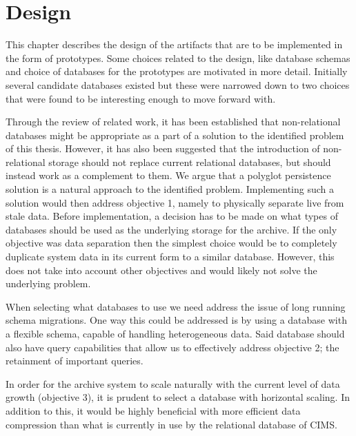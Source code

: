 \chapter{Design}
\label{chap:design}


This chapter describes the design of the artifacts that are to be implemented in the form of prototypes. Some choices related to the design, like database schemas and choice of databases for the prototypes are motivated in more detail. Initially several candidate databases existed but these were narrowed down to two choices that were found to be interesting enough to move forward with. 

Through the review of related work, it has been established that non-relational databases might be appropriate as a part of a solution to the identified problem of this thesis. However, it has also been suggested \cite{NoSQLSurvey} that the introduction of non-relational storage should not replace current relational databases, but should instead work as a complement to them. We argue that a polyglot persistence solution is a natural approach to the identified problem. Implementing such a solution would then address objective 1, namely to physically separate live from stale data. Before implementation, a decision has to be made on what types of databases should be used as the underlying storage for the archive. If the only objective was data separation then the simplest choice would be to completely duplicate system data in its current form to a similar database. However, this does not take into account other objectives and would likely not solve the underlying problem. 

When selecting what databases to use we need address the issue of long running schema migrations. One way this could be addressed is by using a database with a flexible schema, capable of handling heterogeneous data. Said database should also have query capabilities that allow us to effectively address objective 2; the retainment of important queries.

In order for the archive system to scale naturally with the current level of data growth (objective 3), it is prudent to select a database with horizontal scaling. In addition to this, it would be highly beneficial with more efficient data compression than what is currently in use by the relational database of CIMS.

